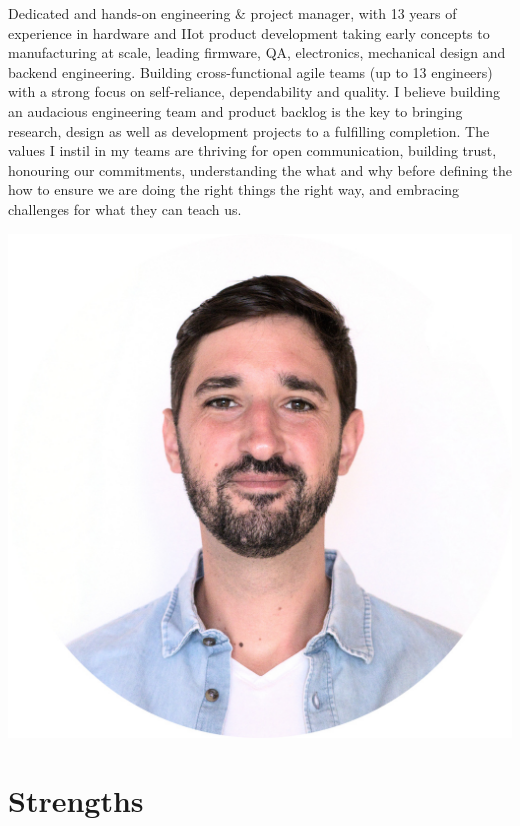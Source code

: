 \documentclass[10pt,a4paper]{moderncv}
\begin{document}
\begin{minipage}{0.79\textwidth}
  Dedicated and hands-on engineering \& project manager, with 13 years of experience in hardware and IIot product development taking early concepts to manufacturing at scale, leading firmware, QA, electronics, mechanical design and backend engineering. Building cross-functional agile teams (up to 13 engineers) with a strong focus on self-reliance, dependability and quality. I believe building an audacious engineering team and product backlog is the key to bringing research, design as well as development projects to a fulfilling completion. The values I instil in my teams are thriving for open communication, building trust, honouring our commitments, understanding the what and why before defining the how to ensure we are doing the right things the right way, and embracing challenges for what they can teach us.
\end{minipage}
\hfill
\begin{minipage}{0.185\textwidth}
  \includegraphics[width=\linewidth]{portrait_round.jpg}
  \vspace{1em}
\end{minipage}

\section{Strengths}
\end{document}
